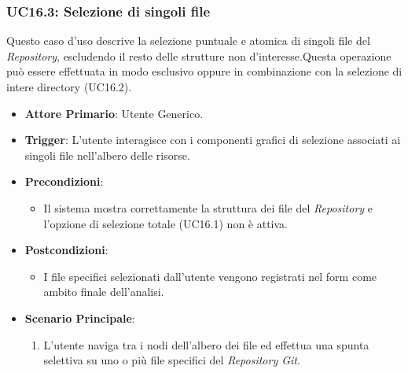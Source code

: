 \documentclass[12pt, a4paper]{article}
\begin{document}
\subsubsection{UC16.3: Selezione di singoli file}\label{uc:16.3}
Questo caso d'uso descrive la selezione puntuale e atomica di singoli file del \textit{Repository}, escludendo il resto delle strutture non d'interesse.Questa operazione può essere effettuata in modo esclusivo oppure in combinazione con la selezione di intere directory (UC16.2).
\begin{itemize}
    \item \textbf{Attore Primario}: Utente Generico.
    \item \textbf{Trigger}: L'utente interagisce con i componenti grafici di selezione associati ai singoli file nell'albero delle risorse.
    \item \textbf{Precondizioni}:\begin{itemize}\item Il sistema mostra correttamente la struttura dei file del \textit{Repository} e l'opzione di selezione totale (UC16.1) non è attiva.\end{itemize}
    \item \textbf{Postcondizioni}:\begin{itemize}\item I file specifici selezionati dall'utente vengono registrati nel form come ambito finale dell'analisi.\end{itemize}
    \item \textbf{Scenario Principale}:
    \begin{enumerate}
        \item L'utente naviga tra i nodi dell'albero dei file ed effettua una spunta selettiva su uno o più file specifici del \textit{Repository Git}.
    \end{enumerate}
\end{itemize}
\end{document}
